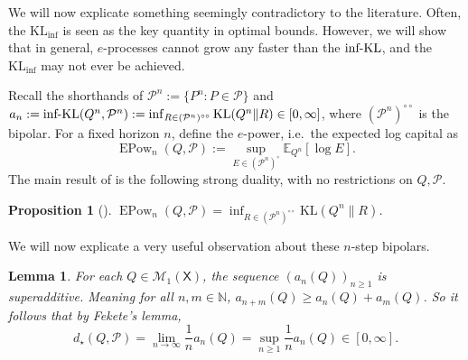 \documentclass[11pt]{article}
\newcommand{\KL}{\mathrm{KL}}
\newcommand{\KLinf}{\mathrm{KL}_{\mathrm{inf}}}
\newcommand{\infKL}{\textnormal{inf-KL}}
\newcommand{\EPow}{\operatorname{EPow}_n}
\newcommand{\E}{\mathbb{E}}
\newcommand{\Pcal}{\mathcal{P}}
\newcommand{\X}{\mathsf{X}}
\newtheorem{proposition}[theorem]{Proposition}
\newtheorem{lemma}[theorem]{Lemma}
\theoremstyle{definition}
\theoremstyle{definition}
\begin{document}
We will now explicate something seemingly contradictory to the literature. Often, the $\KLinf$ is seen as the key quantity in optimal bounds. However, we will show that in general, $e$-processes cannot grow any faster than the $\infKL$, and the $\KLinf$ may not ever be achieved. 

Recall the shorthands of $\Pcal^n:=\{P^n:P\in\Pcal\}$ and $a_n:=\infKL(Q^n,\Pcal^n):=\inf_{R\in(\Pcal^n)^{\circ\circ}}\KL(Q^n\|R)\in[0,\infty]$, where $(\Pcal^n)^{\circ\circ}$ is the bipolar. 
For a fixed horizon $n$, define the $e$-power, i.e.\ the expected log capital as
\[
\EPow(Q,\Pcal):=\sup_{E\in(\Pcal^n)^\circ}\E_{Q^n}[\log E].
\]
The main result of \cite{larsson2025numeraire} is the following strong duality, with no restrictions on $Q,\Pcal$.
\begin{proposition}[\cite{larsson2025numeraire}]\label{prop:infkl-e-power}
$\EPow(Q,\Pcal) = \inf_{R\in(\Pcal^n)^{\circ\circ}}\KL(Q^n \|R)$.
\end{proposition}

We will now explicate a very useful observation about these $n$-step bipolars.

\begin{lemma}\label{lem:an-superadditive-sec}
For each $Q\in\mathcal M_1(\X)$, the sequence $(a_n(Q))_{n\ge 1}$ is superadditive. Meaning for all $n,m\in\mathbb N$, $a_{n+m}(Q)\ge a_n(Q)+a_m(Q)$. So it follows that by Fekete's lemma,
\[
d_{\star}(Q,\Pcal)=\lim_{n\to\infty}\frac1n a_n(Q)=\sup_{n\ge 1}\frac1n a_n(Q)\in[0,\infty].
\]
\end{lemma}
\end{document}
